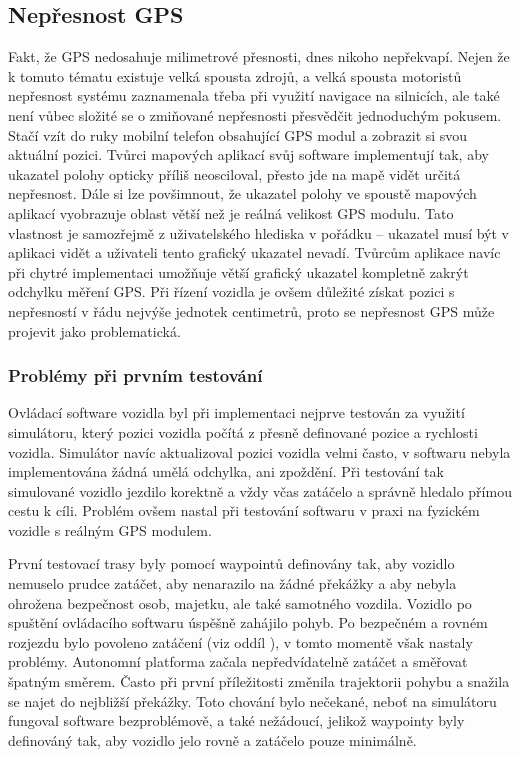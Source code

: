 \documentclass[czech, bachelor]{diploma}
\begin{document}
\subsection{Nepřesnost GPS} \label{gps-inaccuracy}

Fakt, že GPS nedosahuje milimetrové přesnosti, dnes nikoho nepřekvapí. Nejen že k tomuto tématu existuje velká spousta zdrojů,
a velká spousta motoristů nepřesnost systému zaznamenala třeba při využití navigace na silnicích, ale také není vůbec složité se 
o zmiňované nepřesnosti přesvědčit jednoduchým pokusem. Stačí vzít do ruky mobilní telefon obsahující GPS modul a zobrazit si svou
aktuální pozici. Tvůrci mapových aplikací svůj software implementují tak, aby ukazatel polohy opticky příliš neosciloval, přesto
jde na mapě vidět určitá nepřesnost. Dále si lze povšimnout, že ukazatel polohy ve spoustě mapových aplikací vyobrazuje oblast
větší než je reálná velikost GPS modulu. Tato vlastnost je samozřejmě z uživatelského hlediska v pořádku -- ukazatel musí být 
v aplikaci vidět a uživateli tento grafický ukazatel nevadí. Tvůrcům aplikace navíc při chytré implementaci umožňuje větší 
grafický ukazatel kompletně zakrýt odchylku měření GPS. Při řízení vozidla je ovšem důležité získat pozici s nepřesností v řádu
nejvýše jednotek centimetrů, proto se nepřesnost GPS může projevit jako problematická.

\subsubsection{Problémy při prvním testování}

Ovládací software vozidla byl při implementaci nejprve testován za využití simulátoru, který pozici vozidla počítá z přesně 
definované pozice a rychlosti vozidla. Simulátor navíc aktualizoval pozici vozidla velmi často, v softwaru nebyla implementována
žádná umělá odchylka, ani zpoždění. Při testování tak simulované vozidlo jezdilo korektně a vždy včas zatáčelo a správně hledalo
přímou cestu k cíli. Problém ovšem nastal při testování softwaru v praxi na fyzickém vozidle s reálným GPS modulem.

První testovací trasy byly pomocí waypointů definovány tak, aby vozidlo nemuselo prudce zatáčet, aby nenarazilo na žádné překážky
a aby nebyla ohrožena bezpečnost osob, majetku, ale také samotného vozdila. Vozidlo po spuštění ovládacího softwaru úspěšně 
zahájilo pohyb. Po bezpečném a rovném rozjezdu bylo povoleno zatáčení (viz oddíl ), v tomto momentě
však nastaly problémy. Autonomní platforma začala nepředvídatelně zatáčet a směřovat špatným směrem. Často při první příležitosti
změnila trajektorii pohybu a snažila se najet do nejbližší překážky. Toto chování bylo nečekané, neboť na simulátoru fungoval
software bezproblémově, a také nežádoucí, jelikož waypointy byly definováný tak, aby vozidlo jelo rovně a zatáčelo pouze 
minimálně.
\end{document}
